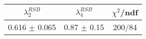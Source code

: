 \begin{tabular}{c|c||c}
$\lambda_{2}^{RSB}$ & $\lambda_4^{RSB}$ & $\chi^{2}$/ndf \\
\hline
0.616 $\pm$ 0.065 & 0.87 $\pm$ 0.15 & 200/84\\
\end{tabular}
